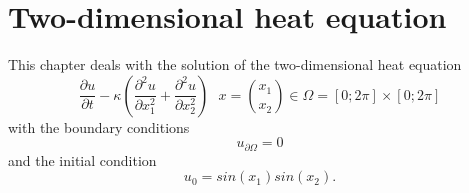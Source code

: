 \section{Two-dimensional heat equation}
\label{sec:heat2d}
This chapter deals with the solution of the two-dimensional heat equation
\begin{equation}
  \frac{\partial u}{\partial t} - \kappa \left(
    \frac{\partial^2 u}{\partial x_1^2}
    + \frac{\partial^2 u}{\partial x_2^2}
  \right)
  ~~~ x = \binom{x_1}{x_2} \in \Omega = [0; 2\pi] \times [0; 2\pi]
\label{eq:heat}
\end{equation}
with the boundary conditions
\begin{equation}
  u_{\partial \Omega} = 0
\label{eq:heat_boundary}
\end{equation}
and the initial condition
\begin{equation}
  u_0 = sin(x_1) sin(x_2).
\label{eq:heat_initial}
\end{equation}

